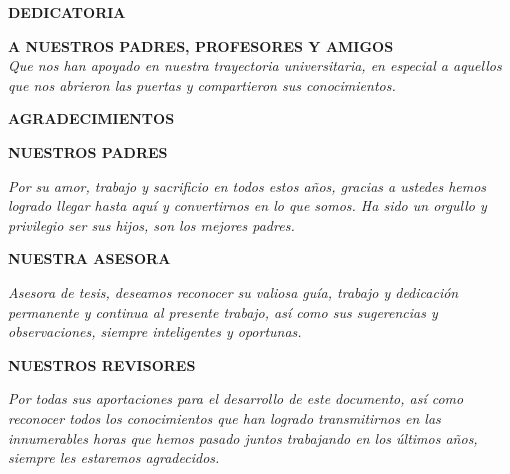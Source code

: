 

\newpage
{\Large \textbf{DEDICATORIA}}
\thispagestyle{empty}
\vspace{2\parsep}


{\flushright \textbf{A NUESTROS PADRES, PROFESORES Y AMIGOS\\} }
\textit{Que nos han apoyado en nuestra trayectoria universitaria, en especial a aquellos que nos abrieron las puertas y compartieron sus conocimientos.}





\vspace{4cm}
{\Large \textbf{AGRADECIMIENTOS}}
\vspace{2\parsep}

{\flushright \textbf{NUESTROS PADRES}\\}

\textit{Por su amor, trabajo y sacrificio en todos estos años, gracias a ustedes hemos logrado llegar hasta aquí y convertirnos en lo que somos. Ha sido un orgullo y privilegio ser sus hijos, son los mejores padres.}
\newline

{\flushright \textbf{NUESTRA ASESORA\\}}

\textit{Asesora de tesis, deseamos reconocer su valiosa guía, trabajo y dedicación permanente y continua al presente trabajo, así como sus sugerencias y observaciones, siempre inteligentes y oportunas.}
\newline

{\flushright \textbf{NUESTROS REVISORES}\\}

\textit{Por todas sus aportaciones para el desarrollo de este documento, así como reconocer todos los conocimientos que han logrado transmitirnos en las innumerables horas que hemos pasado juntos trabajando en los últimos años, siempre les estaremos agradecidos.}
\newline

